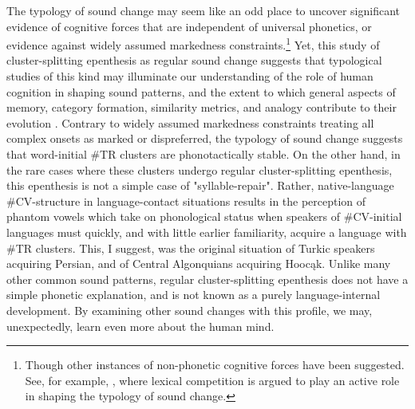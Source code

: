 \documentclass[output=paper,
modfonts
]{LSP/langsci}
\begin{document}
The typology of sound change may seem like an odd place to uncover
significant evidence of cognitive forces that are independent of
universal phonetics, or evidence against widely assumed markedness
constraints.\footnote{Though other instances of non-phonetic cognitive
  forces have been suggested. See, for example, \citet{blevins2009b}, where lexical competition is argued to play an active role in
  shaping the typology of sound change.} Yet, this study of
cluster-splitting epenthesis as regular sound change suggests that
typological studies of this kind may illuminate our understanding of the
role of human cognition in shaping sound patterns, and the extent to
which general aspects of memory, category formation, similarity metrics,
and analogy contribute to their evolution \citep{blevinsblevins2009a}.
Contrary to widely assumed markedness constraints treating all complex
onsets as marked or dispreferred, the typology of sound change suggests
that word-initial \#TR clusters are phonotactically stable. On the other
hand, in the rare cases where these clusters undergo regular
cluster-splitting epenthesis, this epenthesis is not a simple case of
"syllable-repair". Rather, native-language \#CV-structure in
language-contact situations results in the perception of phantom vowels
which take on phonological status when speakers of \#CV-initial
languages must quickly, and with little earlier familiarity, acquire a
language with \#TR clusters. This, I suggest, was the original situation
of Turkic speakers acquiring Persian, and of Central Algonquians
acquiring Hoocąk. Unlike many other common sound patterns, regular
cluster-splitting epenthesis does not have a simple phonetic
explanation, and is not known as a purely language-internal development.
By examining other sound changes with this profile, we may,
unexpectedly, learn even more about the human mind.


\printbibliography[heading=subbibliography,notkeyword=this]
\end{document}
